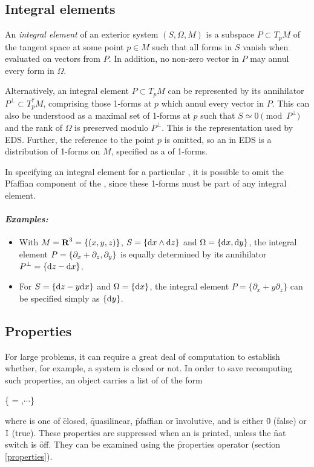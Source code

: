 \subsection{Integral elements}
\label{Integral elements}

An {\it integral element} of an exterior system $(S,\Omega,M)$ is a
subspace $P\subset T_pM$ of the tangent space at some point $p\in M$
such that all forms in $S$ vanish when evaluated on vectors from $P$. In
addition, no non-zero vector in $P$ may annul every form in $\Omega$. 

Alternatively, an integral element $P\subset T_pM$ can be represented
by its annihilator $P^\perp\subset T^*_pM$, comprising those 1-forms
at $p$ which annul every vector in $P$. This can also be understood as a
maximal set of 1-forms at $p$ such that $S \simeq 0 \pmod{P^\perp}$ and
the rank of $\Omega$ is preserved modulo $P^\perp$.  This is the
representation used by EDS. Further, the reference to the point $p$ is
omitted, so an  in EDS is a distribution of
1-forms on $M$, specified as a  of 1-forms. 

In specifying an integral element for a particular , it is
possible to omit the Pfaffian component of the , since these
1-forms must be part of any integral element.

\paragraph{\it Examples:}
\begin{itemize}
\item With $M = \hbox{\bf R}^3 = \{(x,y,z)\}$, $S = \{{\rm d} x\wedge {\rm d} z\}$ and
      $\Omega = \{{\rm d} x,{\rm d} y\}$, the integral element $P = \{\partial\sb
      x + \partial_z,\partial_y\}$ is equally determined by its
      annihilator $P^\perp = \{{\rm d} z - {\rm d} x\}$. 
\item For $S = \{{\rm d} z - y{\rm d} x\}$ and $\Omega = \{{\rm d} x\}$, the integral
      element $P = \{\partial_x + y\partial_z\}$ can be specified
      simply as $\{{\rm d} y\}$.
\end{itemize}

\subsection{Properties}
\label{Properties}

For large problems, it can require a great deal of computation to establish
whether, for example, a system is closed or not. In order to save
recomputing such properties, an  object carries a list of
 of the form
\begin{syntax}
	\{ = ,$\cdots$\}
\end{syntax}
where  is one of \f{closed}, \f{quasilinear}, \f{pfaffian} or
\f{involutive}, and  is either \f{0} (false) or \f{1}
(true). These properties are suppressed when an  is printed,
unless the \f{nat} switch is \f{off}. They can be examined using the
\f{properties} operator (section \ref{properties}).

